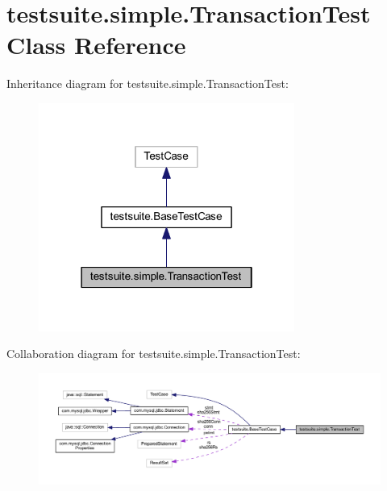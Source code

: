 \hypertarget{classtestsuite_1_1simple_1_1_transaction_test}{}\section{testsuite.\+simple.\+Transaction\+Test Class Reference}
\label{classtestsuite_1_1simple_1_1_transaction_test}


Inheritance diagram for testsuite.\+simple.\+Transaction\+Test\+:
\nopagebreak
\begin{figure}[H]
\begin{center}
\leavevmode
\includegraphics[width=238pt]{classtestsuite_1_1simple_1_1_transaction_test__inherit__graph}
\end{center}
\end{figure}


Collaboration diagram for testsuite.\+simple.\+Transaction\+Test\+:
\nopagebreak
\begin{figure}[H]
\begin{center}
\leavevmode
\includegraphics[width=350pt]{classtestsuite_1_1simple_1_1_transaction_test__coll__graph}
\end{center}
\end{figure}
